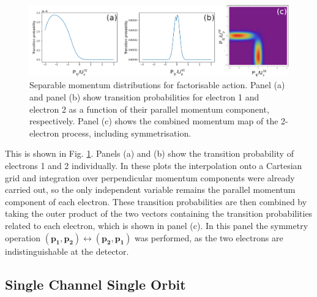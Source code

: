 \documentclass[11pt]{article}
\numberwithin{equation}{section}
\begin{document}
\begin{figure}[!htb]
    \centering
    \includegraphics[width=14cm]{Figures/e1_2_line.png}
    \caption{Separable momentum distributions for factorisable action. Panel (a) and panel (b) show transition probabilities for electron 1 and electron 2 as a function of their parallel momentum component, respectively. Panel (c) shows the combined momentum map of the 2-electron process, including symmetrisation.}
    \label{fig:lines}
\end{figure}
\newline
This is shown in Fig. \ref{fig:lines}. Panels (a) and (b) show the transition probability of electrons 1 and 2 individually. In these plots the interpolation onto a Cartesian grid and integration over perpendicular momentum components were already carried out, so the only independent variable remains the parallel momentum component of each electron. These transition probabilities are then combined by taking the outer product of the two vectors containing the transition probabilities related to each electron, which is shown in panel (c). In this panel the symmetry operation $(\mathbf{p_1},\mathbf{p_2}) \leftrightarrow (\mathbf{p_2},\mathbf{p_1})$ was performed, as the two electrons are indistinguishable at the detector.

\subsection{Single Channel Single Orbit}
\end{document}
